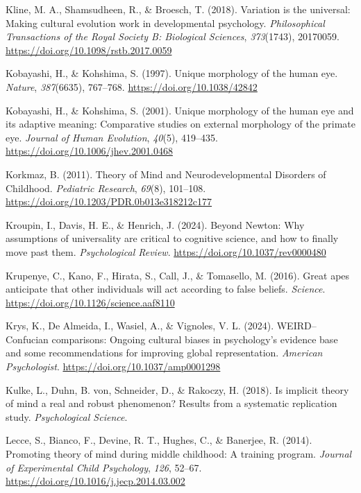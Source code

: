 \documentclass[
]{scrbook}
\newlength{\cslhangindent}
\newenvironment{CSLReferences}[2] %
 {\begin{list}{}{%
  \setlength{\itemindent}{0pt}
  \setlength{\leftmargin}{0pt}
  \setlength{\parsep}{0pt}
  \ifodd #1
   \setlength{\leftmargin}{\cslhangindent}
   \setlength{\itemindent}{-1\cslhangindent}
  \fi
  \setlength{\itemsep}{#2\baselineskip}}}
 {\end{list}}
\begin{document}
\begin{CSLReferences}{1}{0}
Kline, M. A., Shamsudheen, R., \& Broesch, T. (2018). Variation is the universal: Making cultural evolution work in developmental psychology. \emph{Philosophical Transactions of the Royal Society B: Biological Sciences}, \emph{373}(1743), 20170059. \url{https://doi.org/10.1098/rstb.2017.0059}

Kobayashi, H., \& Kohshima, S. (1997). Unique morphology of the human eye. \emph{Nature}, \emph{387}(6635), 767--768. \url{https://doi.org/10.1038/42842}

Kobayashi, H., \& Kohshima, S. (2001). Unique morphology of the human eye and its adaptive meaning: Comparative studies on external morphology of the primate eye. \emph{Journal of Human Evolution}, \emph{40}(5), 419--435. \url{https://doi.org/10.1006/jhev.2001.0468}

Korkmaz, B. (2011). Theory of {Mind} and {Neurodevelopmental Disorders} of {Childhood}. \emph{Pediatric Research}, \emph{69}(8), 101--108. \url{https://doi.org/10.1203/PDR.0b013e318212c177}

Kroupin, I., Davis, H. E., \& Henrich, J. (2024). Beyond {Newton}: {Why} assumptions of universality are critical to cognitive science, and how to finally move past them. \emph{Psychological Review}. \url{https://doi.org/10.1037/rev0000480}

Krupenye, C., Kano, F., Hirata, S., Call, J., \& Tomasello, M. (2016). Great apes anticipate that other individuals will act according to false beliefs. \emph{Science}. \url{https://doi.org/10.1126/science.aaf8110}

Krys, K., De Almeida, I., Wasiel, A., \& Vignoles, V. L. (2024). {WEIRD}--{Confucian} comparisons: {Ongoing} cultural biases in psychology's evidence base and some recommendations for improving global representation. \emph{American Psychologist}. \url{https://doi.org/10.1037/amp0001298}

Kulke, L., Duhn, B. von, Schneider, D., \& Rakoczy, H. (2018). Is implicit theory of mind a real and robust phenomenon? {Results} from a systematic replication study. \emph{Psychological Science}.

Lecce, S., Bianco, F., Devine, R. T., Hughes, C., \& Banerjee, R. (2014). Promoting theory of mind during middle childhood: {A} training program. \emph{Journal of Experimental Child Psychology}, \emph{126}, 52--67. \url{https://doi.org/10.1016/j.jecp.2014.03.002}


\end{CSLReferences}
\end{document}
